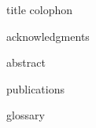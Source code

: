 



{title}
{colophon}

\frontmatter%



{acknowledgments}

{abstract}

\tableofcontents

{publications}



\listoffigures%

\listoftables%

\listofalgorithms





{glossary}
